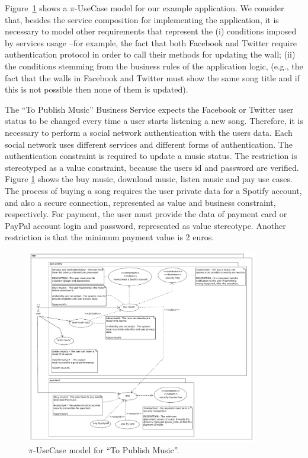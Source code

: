 \begin{example}\label{ex:toPublicMusic2}
Figure~\ref{fig:CIM:piusecasetpm} shows a $\pi$-UseCase model for our example application.
We consider that, besides the service composition for implementing the application, it is necessary to model  other requirements that represent the (i) conditions imposed by services usage --for example, the fact that both Facebook and Twitter require authentication protocol in order to call their methods for updating the wall; (ii) the conditions stemming from the business rules of the application logic, (e.g., the fact that the walls in Facebook and Twitter must show the same song title and if this is not possible then none of them is updated). 
 
The ``To Publish Music'' Business Service expects  the Facebook or Twitter user status to be changed every time a user starts listening a new song.
Therefore, it is necessary to perform a social network authentication with the users data. Each social network uses different services and different forms of authentication. The authentication constraint is required to update a music status. The restriction is stereotyped as a value constraint, because the users id and password are verified.  Figure \ref{fig:CIM:piusecasetpm} shows the buy music, download music, listen music and pay use cases. The process of buying a song requires the user private data for a Spotify account, and also a secure connection, represented as value and business constraint, respectively. For payment, the user must provide the data of payment card or PayPal account login and password, represented as value stereotype. 
Another restriction is that the minimum payment value is 2 euros.
\end{example} 

\begin{figure}
\center
\includegraphics[width=0.9\textwidth]{figs/UseCase.pdf}
\caption{\label{fig:CIM:piusecasetpm} $\pi$-UseCase model for ``To Publish Music''.}
\end{figure}
 

